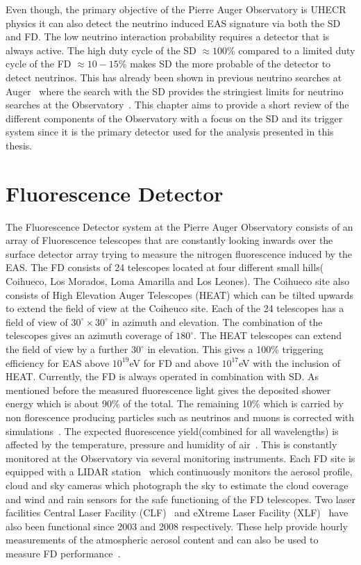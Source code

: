 Even though, the primary objective of the Pierre Auger Observatory is UHECR physics it can also detect the neutrino induced EAS signature via both the SD and FD. The low neutrino interaction probability requires a detector that is always active. The high duty cycle of the SD $\approx 100$\% compared to a limited duty cycle of the FD $\approx 10-15$\% makes SD the more probable of the detector to detect neutrinos. This has already been shown in previous neutrino searches at Auger~\cite{} where the search with the SD provides the stringiest limits for neutrino searches at the Observatory~\cite{}. This chapter aims to provide a short review of the different components of the Observatory with a focus on the SD and its trigger system since it is the primary detector used for the analysis presented in this thesis. 

\section{Fluorescence Detector}
\label{sec:Fl_det}
The Fluorescence Detector system at the Pierre Auger Observatory consists of an array of Fluorescence telescopes that are constantly looking inwards over the surface detector array trying to measure the nitrogen fluorescence induced by the EAS. The FD consists of 24 telescopes located at four different small hills( Coihueco, Los Morados, Loma Amarilla and Los Leones). The Coihueco site also consists of High Elevation Auger Telescopes (HEAT) which can be tilted upwards to extend the field of view at the Coiheuco site. Each of the 24 telescopes has a field of view of $30^{\circ} \times 30^{\circ}$ in azimuth and elevation. The combination of the telescopes gives an azimuth coverage of $180^{\circ}$. The HEAT telescopes can extend the field of view by a further $30^{\circ}$ in elevation. This gives a 100\% triggering efficiency for EAS above $10^{19}$eV for FD and above $10^{17}$eV with the inclusion of HEAT. Currently, the FD is always operated in combination with SD. As mentioned before the measured fluorescence light gives the deposited shower energy which is about 90\% of the total. The remaining 10\% which is carried by non florescence producing particles such as neutrinos and muons is corrected with simulations~\cite{}. The expected fluorescence yield(combined for all wavelengths) is affected by the temperature, pressure and humidity of air~\cite{}. This is constantly monitored at the Observatory via several monitoring instruments. Each FD site is equipped with a LIDAR station~\cite{} which continuously monitors the aerosol profile, cloud and sky cameras which photograph the sky to estimate the cloud coverage and wind and rain sensors for the safe functioning of the FD telescopes. Two laser facilities Central Laser Facility (CLF)~\cite{} and eXtreme Laser Facility (XLF)~\cite{} have also been functional since 2003 and 2008 respectively. These help provide hourly measurements of the atmospheric aerosol content and can also be used to measure FD performance~\cite{}. 

